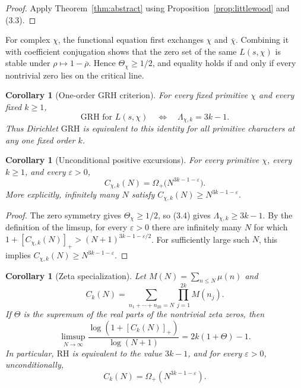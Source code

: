 \documentclass[11pt]{article}
\newtheorem{corollary}[theorem]{Corollary}
\theoremstyle{remark}
\newcommand{\GRH}{\mathrm{GRH}}
\newcommand{\RH}{\mathrm{RH}}
\newcommand{\eps}{\varepsilon}
\begin{document}
\begin{proof}
Apply Theorem~\ref{thm:abstract} using Proposition~\ref{prop:littlewood} and (3.3).
\end{proof}

For complex $\chi$, the functional equation first exchanges $\chi$ and $\overline\chi$.
Combining it with coefficient conjugation shows that the zero set of the same $L(s,\chi)$ is
stable under $\rho\mapsto1-\overline\rho$.  Hence $\Theta_\chi\geq1/2$, and equality holds if
and only if every nontrivial zero lies on the critical line.

\begin{corollary}[One-order $\GRH$ criterion]
For every fixed primitive $\chi$ and every fixed $k\geq1$,
\[
 \GRH\text{ for }L(s,\chi)
 \quad\Longleftrightarrow\quad
 \Lambda_{\chi,k}=3k-1.
\]
Thus Dirichlet $\GRH$ is equivalent to this identity for all primitive characters at any one
fixed order $k$.
\end{corollary}

\begin{corollary}[Unconditional positive excursions]
\label{cor:omega}
For every primitive $\chi$, every $k\geq1$, and every $\eps>0$,
\begin{equation}
 C_{\chi,k}(N)=\Omega_+\bigl(N^{3k-1-\eps}\bigr).
 \tag{3.5}
\end{equation}
More explicitly, infinitely many $N$ satisfy
$C_{\chi,k}(N)\geq N^{3k-1-\eps}$.
\end{corollary}

\begin{proof}
The zero symmetry gives $\Theta_\chi\geq1/2$, so (3.4) gives
$\Lambda_{\chi,k}\geq3k-1$.  By the definition of the limsup, for every $\eps>0$ there are
infinitely many $N$ for which
$1+[C_{\chi,k}(N)]_+>(N+1)^{3k-1-\eps/2}$.  For sufficiently large such $N$, this implies
$C_{\chi,k}(N)\geq N^{3k-1-\eps}$.
\end{proof}

\begin{corollary}[Zeta specialization]
Let $M(N)=\sum_{n\leq N}\mu(n)$ and
\[
 C_k(N)=\sum_{n_1+\cdots+n_{2k}=N}\prod_{j=1}^{2k}M(n_j).
\]
If $\Theta$ is the supremum of the real parts of the nontrivial zeta zeros, then
\[
 \limsup_{N\to\infty}\frac{\log(1+[C_k(N)]_+)}{\log(N+1)}
 =2k(1+\Theta)-1.
\]
In particular, $\RH$ is equivalent to the value $3k-1$, and for every $\eps>0$,
unconditionally,
\[
C_k(N)=\Omega_+(N^{3k-1-\eps}).
\]
\end{corollary}
\end{document}
